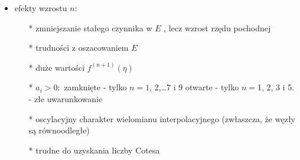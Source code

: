 	\begin{frame}
	\begin{itemize}
		\item efekty wzrostu $n$:
        \begin{itemize}
        	\item[*]  zmniejszanie stałego czynnika w $E$ , lecz wzrost rzędu pochodnej
            \item[*] trudności z oszacowaniem $E$
            \item[*] duże wartości $f^{(n+1)}(\eta)$
            \item[*] $a_{i}>0:$
            zamknięte - tylko $n=1$, 2,\ldots 7 i 9
            otwarte - tylko $n=$1, 2, 3 i 5. - złe uwarunkowanie
            \item[*] oscylacyjny charakter wielomianu interpolacyjnego (zwłaszcza, że
 			węzły są równoodległe)
            \item[*] trudne do uzyskania liczby Cotesa
        \end{itemize}
	\end{itemize}
	\end{frame}






